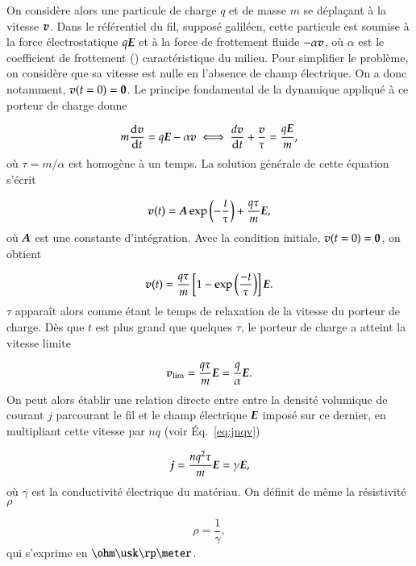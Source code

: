 On considère alors une particule de charge $q$ et de masse $m$ se déplaçant à la
vitesse $\vecv$.
Dans le référentiel du fil, supposé galiléen, cette particule est soumise à la 
force électrostatique $q\vece$ et à la force de frottement fluide $-\alpha \vecv$, 
où $\alpha$ est le coefficient de frottement (\kilogram \usk \reciprocal \second)
caractéristique du milieu. Pour simplifier le problème, 
on considère que sa vitesse est nulle en 
l'absence de champ électrique. On a donc notamment, $\vecv(t = 0) = \mitbf{0}$.
Le principe fondamental de la dynamique appliqué 
à ce porteur de charge donne

\begin{equation}
	m \dfrac{\mathrm{d}\vecv}{\dt} = q\vece - \alpha\vecv
	\iff \dfrac{d\vecv}{\dt} + \dfrac{\vecv}{\tau} = \dfrac{q\vece}{m},
\end{equation}
où $\tau = m/\alpha$ est homogène à un temps. La solution générale de cette équation
s'écrit

\begin{equation}
	\vecv(t) = \veca \exp\left(-\dfrac{t}{\tau}\right) + \dfrac{q\tau}{m}\vece,
\end{equation}
où $\veca$ est une constante d'intégration. Avec la condition initiale,
$\vecv(t=0) = \mitbf{0}$, on obtient

\begin{equation}
	\vecv(t) = \dfrac{q \tau}{m} 
	           \left[1 - \exp\left(\dfrac{-t}{\tau}\right)\right]\vece.
\end{equation}
$\tau$ apparaît alors comme étant le temps de relaxation de la vitesse du  
porteur de charge. Dès que $t$ est plus grand que quelques $\tau$, 
le porteur de charge a atteint la vitesse limite

\begin{equation}
	\vecv_\mathrm{lim} = \dfrac{q \tau}{m} \vece = \dfrac{q}{\alpha} \vece.
\end{equation}
On peut alors établir une relation directe entre entre la densité volumique
de courant $j$ parcourant le fil et le champ électrique $\vece$ imposé sur ce dernier,
en multipliant cette vitesse par $nq$ (voir Éq.~\ref{eq:jnqv})

\begin{equation}
	\vecj = \dfrac{nq^2\tau}{m} \vece = \gamma \vece,
\end{equation}
où $\gamma$ est la conductivité électrique du matériau. On définit de même
la résistivité $\rho$

\begin{equation}
	\rho = \dfrac{1}{\gamma},
\end{equation}
qui s'exprime en $\ohm \usk \rp \meter$.

